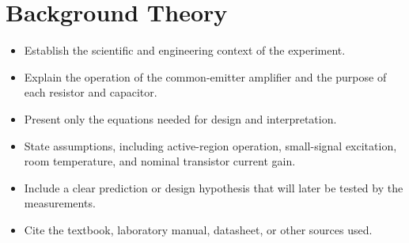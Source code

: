 \documentclass[11pt,a4paper]{article}
\begin{document}
\section{Background Theory}
\begin{sectionguide}
\begin{itemize}
  \item Establish the scientific and engineering context of the experiment.
  \item Explain the operation of the common-emitter amplifier and the purpose
        of each resistor and capacitor.
  \item Present only the equations needed for design and interpretation.
  \item State assumptions, including active-region operation, small-signal
        excitation, room temperature, and nominal transistor current gain.
  \item Include a clear prediction or design hypothesis that will later be
        tested by the measurements.
  \item Cite the textbook, laboratory manual, datasheet, or other sources used.
\end{itemize}
\end{sectionguide}
\end{document}
